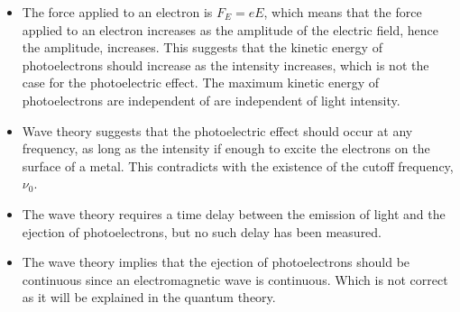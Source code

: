 			\begin{itemize}
				\item The force applied to an electron is $F_E = eE$, which means that the force applied to an electron increases as the amplitude of the electric field, hence the amplitude, increases. This suggests that the kinetic energy of photoelectrons should increase as the intensity increases, which is not the case for the photoelectric effect. The maximum kinetic energy of photoelectrons are independent of are independent of light intensity.
				\item Wave theory suggests that the photoelectric effect should occur at any frequency, as long as the intensity if enough to excite the electrons on the surface of a metal. This contradicts with the existence of the cutoff frequency, $\nu_0$.
				\item The wave theory requires a time delay between the emission of light and the ejection of photoelectrons, but no such delay has been measured.
				\item The wave theory implies that the ejection of photoelectrons should be continuous since an electromagnetic wave is continuous. Which is not correct as it will be explained in the quantum theory. 
			\end{itemize}
		
